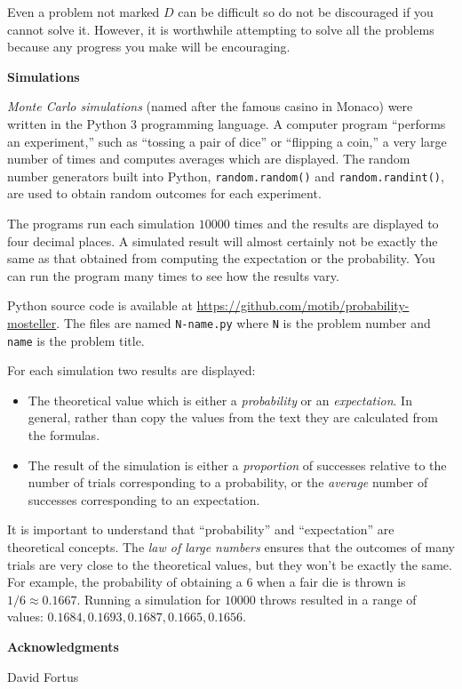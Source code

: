 Even a problem not marked $D$ can be difficult so do not be discouraged if you cannot solve it. However, it is worthwhile attempting to solve all the problems because any progress you make will be encouraging.

\newpage

\textbf{Simulations}

\emph{Monte Carlo simulations} (named after the famous casino in Monaco) were written in the Python 3 programming language. A computer program ``performs an experiment,'' such as ``tossing a pair of dice'' or ``flipping a coin,'' a very large number of times and computes averages which are displayed. The random number generators built into Python, \verb+random.random()+ and \verb+random.randint()+, are used to obtain random outcomes for each experiment.

The programs run each simulation $10000$ times and the results are displayed to four decimal places. A simulated result will almost certainly not be exactly the same as that obtained from computing the expectation or the probability. You can run the program many times to see how the results vary.

Python source code is available at \url{https://github.com/motib/probability-mosteller}. The files are named \verb+N-name.py+ where \verb+N+ is the problem number and \verb+name+ is the problem title.

For each simulation two results are displayed: 
\begin{itemize}
\item The theoretical value which is either a \emph{probability} or an \emph{expectation}. In general, rather than copy the values from the text they are calculated from the formulas. 
\item The result of the simulation is either a \emph{proportion} of successes relative to the number of trials corresponding to a probability, or the \emph{average} number of successes corresponding to an expectation.
\end{itemize}
It is important to understand that ``probability'' and ``expectation'' are theoretical concepts. The \emph{law of large numbers} ensures that the outcomes of many trials are very close to the theoretical values, but they won't be exactly the same. For example, the probability of obtaining a $6$ when a fair die is thrown is $1/6\approx 0.1667$. Running a simulation for $10000$ throws resulted in a range of values: $0.1684, 0.1693, 0.1687, 0.1665, 0.1656$.

\textbf{Acknowledgments}

David Fortus
